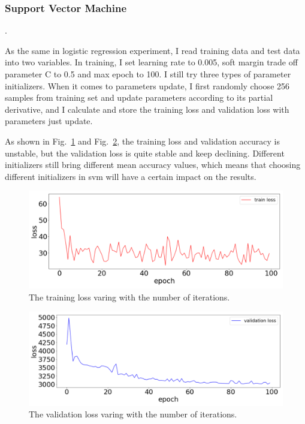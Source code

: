 \documentclass[journal, a4paper]{IEEEtran}
\begin{document}
\subsubsection{Support Vector Machine}
.

As the same in logistic regression experiment, I read training data and test data into two variables. In training, I set learning rate to 0.005, soft margin trade off parameter C to 0.5 and max epoch to 100. I still try three types of parameter initializers. When it comes to parameters update, I first randomly choose 256 samples from training set and update parameters according to its partial derivative, and I calculate and store the training loss and validation loss with parameters just update.

As shown in Fig.~\ref{fig:svm0} and Fig.~\ref{fig:svm1}, the training loss and validation accuracy is unstable, but the validation loss is quite stable and keep declining. Different initializers still bring different mean  accuracy values, which means that choosing different initializers in svm will have a certain impact on the results.

	\begin{figure}[!hbt]
		\begin{center}
		\includegraphics[width=\columnwidth]{svm0}
		\caption{The training loss varing with the number of iterations.}
		\label{fig:svm0}
		\end{center}
	\end{figure}
	
	\begin{figure}[!hbt]
		\begin{center}
		\includegraphics[width=\columnwidth]{svm1}
		\caption{The validation loss varing with the number of iterations.}
		\label{fig:svm1}
		\end{center}
	\end{figure}
	
\end{document}
